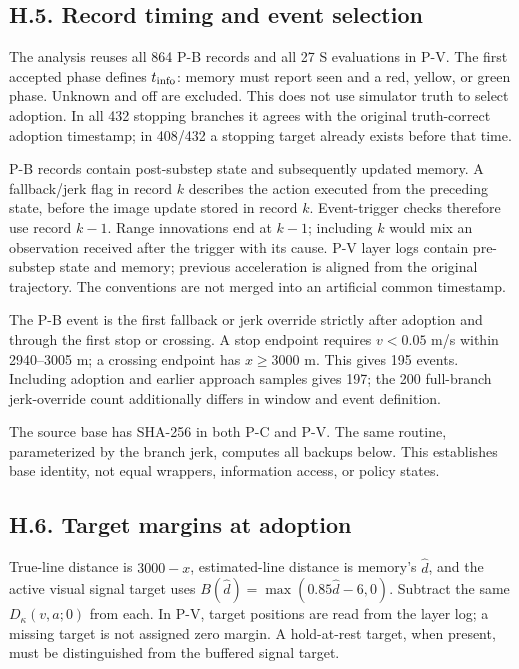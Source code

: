 \documentclass[letterpaper,journal,onecolumn]{IEEEtran}
\begin{document}
\subsection*{H.5. Record timing and event selection}

The analysis reuses all 864 P-B records and all 27 S evaluations in P-V. The first accepted phase defines \(t_{\rm info}\): memory must report seen and a red, yellow, or green phase. Unknown and off are excluded. This does not use simulator truth to select adoption. In all 432 stopping branches it agrees with the original truth-correct adoption timestamp; in 408/432 a stopping target already exists before that time.

P-B records contain post-substep state and subsequently updated memory. A fallback/jerk flag in record \(k\) describes the action executed from the preceding state, before the image update stored in record \(k\). Event-trigger checks therefore use record \(k-1\). Range innovations end at \(k-1\); including \(k\) would mix an observation received after the trigger with its cause. P-V layer logs contain pre-substep state and memory; previous acceleration is aligned from the original trajectory. The conventions are not merged into an artificial common timestamp.

The P-B event is the first fallback or jerk override strictly after adoption and through the first stop or crossing. A stop endpoint requires \(v<0.05\) m/s within 2940--3005 m; a crossing endpoint has \(x\ge3000\) m. This gives 195 events. Including adoption and earlier approach samples gives 197; the 200 full-branch jerk-override count additionally differs in window and event definition.

The source base  has SHA-256  in both P-C and P-V. The same routine, parameterized by the branch jerk, computes all backups below. This establishes base identity, not equal wrappers, information access, or policy states.

\subsection*{H.6. Target margins at adoption}

True-line distance is \(3000-x\), estimated-line distance is memory's \(\widehat d\), and the active visual signal target uses \(B(\widehat d)=\max(0.85\widehat d-6,0)\). Subtract the same \(D_\kappa(v,a;0)\) from each. In P-V, target positions are read from the layer log; a missing target is not assigned zero margin. A hold-at-rest target, when present, must be distinguished from the buffered signal target.
\end{document}
